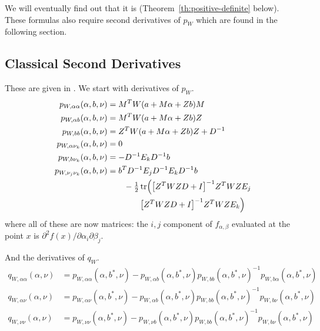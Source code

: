   We will eventually find out that it is
(Theorem~\ref{th:positive-definite} below).
These formulas also require second derivatives of $p_W$ which are found
in the following section.

\subsection{Classical Second Derivatives}
\label{sec:second-derivatives}

These are given in \citet[Section~1.8]{reaster-tr}.
We start with derivatives of $p_W$.
\begin{subequations}
\begin{align}
   p_{W,\alpha \alpha}(\alpha, b, \nu)
   & =
   M^T W(a + M \alpha + Z b) M
   \\
   p_{W, \alpha b}(\alpha, b, \nu)
   & =
   M^T W(a + M \alpha + Z b) Z
   \\
   p_{W, b b}(\alpha, b, \nu)
   & =
   Z^T W(a + M \alpha + Z b) Z + D^{- 1}
   \label{eq:p-w-b-b}
   \\
   p_{W, \alpha \nu_k}(\alpha, b, \nu)
   & =
   0
   \\
   p_{W, b \nu_k}(\alpha, b, \nu)
   & =
   - D^{- 1} E_k D^{- 1} b
   \\
   p_{W, \nu_j \nu_k}(\alpha, b, \nu)
   & =
   b^T D^{- 1} E_j D^{- 1} E_k D^{- 1} b
   \nonumber
   \\
   & \qquad
   -
   \tfrac{1}{2} \operatorname{tr} \Bigl(
   \bigl[ Z^T W Z D + I \bigr]^{- 1}
   Z^T W Z E_j
   \nonumber
   \\
   & \qquad \qquad
   \bigl[ Z^T W Z D + I \bigr]^{- 1}
   Z^T W Z E_k
   \Bigr)
\end{align}
\end{subequations}
where all of these are now matrices: the $i, j$ component
of $f_{\alpha, \beta}$ evaluated at the point $x$ is
$\partial^2 f(x) / \partial \alpha_i \partial \beta_j$.

And the derivatives of $q_W$.
\begin{subequations}
\begin{align}
   q_{W, \alpha \alpha}(\alpha, \nu)
   & =
   p_{W, \alpha \alpha}(\alpha, b^*, \nu)
   -
   p_{W, \alpha b}(\alpha, b^*, \nu)
   p_{W, b b}(\alpha, b^*, \nu)^{-1} p_{W, b \alpha}(\alpha, b^*, \nu)
   \label{eq:q-alpha-alpha}
   \\
   q_{W, \alpha \nu}(\alpha, \nu)
   & =
   p_{W, \alpha \nu}(\alpha, b^*, \nu)
   -
   p_{W, \alpha b}(\alpha, b^*, \nu)
   p_{W, b b}(\alpha, b^*, \nu)^{-1} p_{W, b \nu}(\alpha, b^*, \nu)
   \label{eq:q-alpha-nu}
   \\
   q_{W, \nu \nu}(\alpha, \nu)
   & =
   p_{W, \nu \nu}(\alpha, b^*, \nu)
   -
   p_{W, \nu b}(\alpha, b^*, \nu)
   p_{W, b b}(\alpha, b^*, \nu)^{-1} p_{W, b \nu}(\alpha, b^*, \nu)
   \label{eq:q-nu-nu}
\end{align}
\end{subequations}

